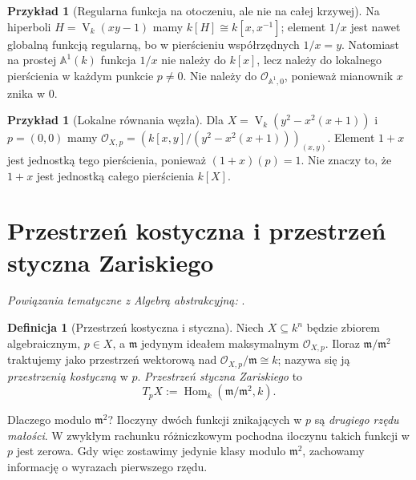 \documentclass[11pt,a4paper,openany]{report}
\numberwithin{equation}{section}
\theoremstyle{plain}
\theoremstyle{definition}
\newtheorem{definicja}[twierdzenie]{Definicja}
\newtheorem{przyklad}[twierdzenie]{Przykład}
\theoremstyle{remark}
\newcommand{\A}{\mathbb A}
\newcommand{\V}{\operatorname V}
\begin{document}
\begin{przyklad}[Regularna funkcja na otoczeniu, ale nie na całej krzywej]
Na hiperboli $H=\V_k(xy-1)$ mamy
$k[H]\cong k[x,x^{-1}]$; element $1/x$ jest nawet
globalną funkcją regularną, bo w pierścieniu współrzędnych
$1/x=y$. Natomiast na prostej $\A^1(k)$ funkcja $1/x$
nie należy do $k[x]$, lecz należy do lokalnego pierścienia
w każdym punkcie $p\ne0$. Nie należy do
$\mathcal O_{\A^1,0}$, ponieważ mianownik $x$ znika w $0$.
\end{przyklad}

\begin{przyklad}[Lokalne równania węzła]
Dla $X=\V_k(y^2-x^2(x+1))$ i $p=(0,0)$
mamy $\mathcal O_{X,p}=(k[x,y]/(y^2-x^2(x+1)))_{(x,y)}$.
Element $1+x$ jest jednostką tego pierścienia, ponieważ
$(1+x)(p)=1$. Nie znaczy to, że $1+x$ jest jednostką
całego pierścienia $k[X]$.
\end{przyklad}

\section{Przestrzeń kostyczna i przestrzeń styczna Zariskiego}

\noindent\emph{Powiązania tematyczne z Algebrą abstrakcyjną:} .


\begin{definicja}[Przestrzeń kostyczna i styczna]
\label{def:tangent-zariski}
Niech $X\subseteq k^n$ będzie zbiorem algebraicznym,
$p\in X$, a $\mathfrak m$ jedynym ideałem maksymalnym
$\mathcal O_{X,p}$. Iloraz $\mathfrak m/\mathfrak m^2$
traktujemy jako przestrzeń wektorową nad
$\mathcal O_{X,p}/\mathfrak m\cong k$; nazywa się ją
\emph{przestrzenią kostyczną} w $p$.
\emph{Przestrzeń styczna Zariskiego} to
\[
 T_pX:=\operatorname{Hom}_k(\mathfrak m/\mathfrak m^2,k).
\]
\end{definicja}

Dlaczego modulo $\mathfrak m^2$? Iloczyny dwóch funkcji
znikających w $p$ są \emph{drugiego rzędu małości}.
W zwykłym rachunku różniczkowym pochodna iloczynu
takich funkcji w $p$ jest zerowa. Gdy więc zostawimy
jedynie klasy modulo $\mathfrak m^2$, zachowamy
informację o wyrazach pierwszego rzędu.
\end{document}
